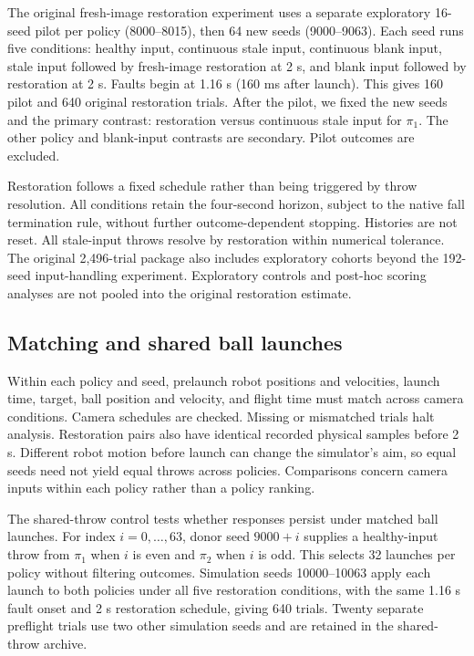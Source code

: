 The original fresh-image restoration experiment uses a separate exploratory
16-seed pilot per policy (8000--8015), then 64 new seeds (9000--9063). Each seed
runs five conditions: healthy input, continuous stale input, continuous blank
input, stale input followed by fresh-image restoration at 2 s, and blank input
followed by restoration at 2 s. Faults begin at 1.16 s (160 ms after launch).
This gives 160 pilot and 640 original restoration trials. After the pilot,
we fixed the new seeds and the primary contrast:
restoration versus continuous stale input for $\pi_1$. The other policy and
blank-input contrasts are secondary. Pilot outcomes are excluded.

Restoration follows a fixed schedule rather than being triggered by throw
resolution. All conditions retain the four-second horizon, subject to the
native fall termination rule, without further outcome-dependent stopping.
Histories are not reset. All stale-input throws resolve by restoration within
numerical tolerance. The original 2,496-trial package also includes exploratory
cohorts beyond the 192-seed input-handling experiment. Exploratory controls and
post-hoc scoring analyses are not pooled into the original restoration estimate.

\subsection{Matching and shared ball launches}
Within each policy and seed, prelaunch robot positions and velocities, launch
time, target, ball position and velocity, and flight time must match across
camera conditions. Camera schedules are checked. Missing or mismatched trials
halt analysis. Restoration pairs also have identical recorded physical samples
before 2 s. Different robot motion before launch can change the simulator's
aim, so equal seeds need not yield equal throws across policies. Comparisons
concern camera inputs within each policy rather than a policy ranking.

The shared-throw control tests whether responses persist under matched ball
launches. For index $i=0,\ldots,63$, donor seed $9000+i$ supplies a healthy-input
throw from $\pi_1$ when $i$ is even and $\pi_2$ when $i$ is odd. This selects
32 launches per policy without filtering outcomes. Simulation seeds
10000--10063 apply each launch to both policies under all five restoration
conditions, with the same 1.16 s fault onset and 2 s restoration schedule,
giving 640 trials. Twenty separate preflight trials use two other
simulation seeds and are retained in the shared-throw archive.

